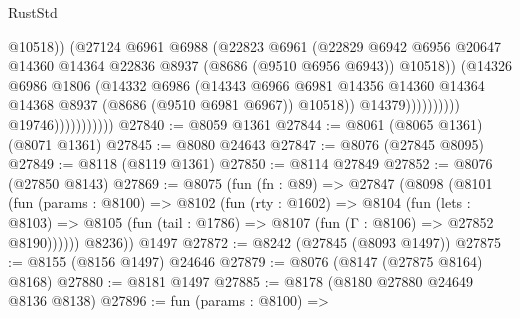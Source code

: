 \begin{lexlean}{RustStd}
\begin{coremodule}
                                              @10518))
                                          (@27124
                                            @6961
                                            @6988
                                            (@22823
                                              @6961
                                              (@22829
                                                @6942
                                                @6956
                                                @20647
                                                @14360
                                                @14364
                                                @22836
                                                @8937
                                                (@8686 (@9510 @6956 @6943))
                                                @10518))
                                            (@14326
                                              @6986
                                              @1806
                                              (@14332
                                                @6986
                                                (@14343
                                                  @6966
                                                  @6981
                                                  @14356
                                                  @14360
                                                  @14364
                                                  @14368
                                                  @8937
                                                  (@8686 (@9510 @6981 @6967))
                                                  @10518))
                                              @14379))))))))))
                          @19746)))))))))))
@27840 := @8059 @1361
@27844 := @8061 (@8065 @1361) (@8071 @1361)
@27845 := @8080 @24643
@27847 := @8076 (@27845 @8095)
@27849 := @8118 (@8119 @1361)
@27850 := @8114 @27849
@27852 := @8076 (@27850 @8143)
@27869 := @8075
    (fun (fn : @89) =>
    @27847
      (@8098
        (@8101
          (fun (params : @8100) =>
          @8102
            (fun (rty : @1602) =>
            @8104
              (fun (lets : @8103) =>
              @8105 (fun (tail : @1786) => @8107 (fun (Γ : @8106) => @27852 @8190))))))
        @8236))
    @1497
@27872 := @8242 (@27845 (@8093 @1497))
@27875 := @8155 (@8156 @1497) @24646
@27879 := @8076 (@8147 (@27875 @8164) @8168)
@27880 := @8181 @1497
@27885 := @8178 (@8180 @27880 @24649 @8136 @8138)
@27896 := fun (params : @8100) =>

\end{coremodule}
\end{lexlean}
